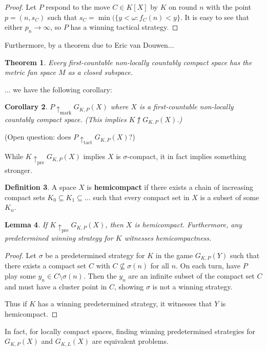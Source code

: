\documentclass[11pt]{article}
\theoremstyle{plain}
\newtheorem{theorem}{Theorem}
\newtheorem{lemma}[theorem]{Lemma}
\newtheorem{corollary}[theorem]{Corollary}
\theoremstyle{definition}
\newtheorem{definition}[theorem]{Definition}
\theoremstyle{remark}
\newcommand{\prewin}{\uparrow_{\text{pre}}}
\newcommand{\markwin}{\uparrow_{\text{mark}}}
\newcommand{\tactwin}{\uparrow_{\text{tact}}}
\begin{document}
\begin{proof}
Let $P$ respond to the move $C\in K[X]$ by $K$ on round $n$ with the point $p=(n,s_C)$ such that $s_C = \min(\{y<\omega : f_C(n) < y\}$. It is easy to see that either $p_n\rightarrow \infty$, so $P$ has a winning tactical strategy.
\end{proof}

Furthermore, by a theorem due to Eric van Douwen...

\begin{theorem}
Every first-countable non-locally countably compact space has the metric fan space $M$ as a closed subspace.
\end{theorem}

... we have the following corollary:

\begin{corollary}
$P \markwin G_{K,P}(X)$ where $X$ is a first-countable non-locally countably compact space. (This implies $K\not\uparrow G_{K,P}(X)$.)
\end{corollary}

(Open question: does $P \tactwin G_{K,P}(X)$?)

While $K\prewin G_{K,P}(X)$ implies $X$ is $\sigma$-compact, it in fact implies something stronger.

\begin{definition}
A space $X$ is \textbf{hemicompact} if there exists a chain of increasing compact sets $K_0\subseteq K_1 \subseteq \dots$ such that every compact set in $X$ is a subset of some $K_n$.
\end{definition}

\begin{lemma}
If $K\prewin G_{K,P}(X)$, then $X$ is hemicompact. Furthermore, any predetermined winning strategy for $K$ witnesses hemicompactness.
\end{lemma}

\begin{proof}
Let $\sigma$ be a predetermined strategy for $K$ in the game $G_{K,P}(Y)$ such that there exists a compact set $C$ with $C \not\subseteq \sigma(n)$ for all $n$. On each turn, have $P$ play some $y_n\in C \setminus \sigma(n)$. Then the $y_n$ are an infinite subset of the compact set $C$ and must have a cluster point in $C$, showing $\sigma$ is not a winning strategy.

Thus if $K$ has a winning predetermined strategy, it witnesses that $Y$ is hemicompact.
\end{proof}

In fact, for locally compact spaces, finding winning predetermined strategies for $G_{K,P}(X)$ and $G_{K,L}(X)$ are equivalent problems.
\end{document}
